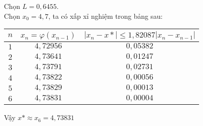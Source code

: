 Chọn $L=0,6455 $.\\
Chọn $x_0=4,7 $, ta có xấp xỉ nghiệm trong bảng sau:\\
\begin{center}\begin{tabular}{|c|c|c|}
	\hline
	$n$ & $x_n=\varphi\left(x_{n-1}\right) $ & $\left| x_n - x* \right| \leq 1,82087 \left|x_n - x_{n-1}\right|$\\ \hline 
	$1$ & $4,72956$ & $0,05382$\\ \hline
	$2$ & $4,73641$ & $0,01247$ \\ \hline
	$3$ & $4,73791$ & $0,02731$ \\ \hline
	$4$ & $4,73822$ & $0,00056$ \\ \hline
	$5$ & $4,73829$ & $0,00013$ \\ \hline
	$6$ & $4,73831$ & $0,00004$ \\ \hline
\end{tabular}\end{center}
Vậy $x*\approx x_6 = 4,73831 $\par